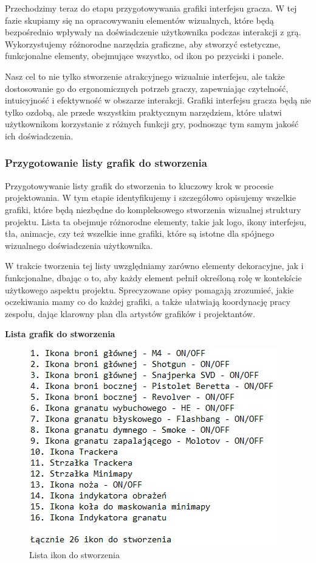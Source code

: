 Przechodzimy teraz do etapu przygotowywania grafiki interfejsu gracza. W tej fazie skupiamy się na opracowywaniu elementów wizualnych, które będą bezpośrednio wpływały na doświadczenie użytkownika podczas interakcji z grą. Wykorzystujemy różnorodne narzędzia graficzne, aby stworzyć estetyczne, funkcjonalne elementy, obejmujące wszystko, od ikon po przyciski i panele.

Nasz cel to nie tylko stworzenie atrakcyjnego wizualnie interfejsu, ale także dostosowanie go do ergonomicznych potrzeb graczy, zapewniając czytelność, intuicyjność i efektywność w obszarze interakcji. Grafiki interfejsu gracza będą nie tylko ozdobą, ale przede wszystkim praktycznym narzędziem, które ułatwi użytkownikom korzystanie z różnych funkcji gry, podnosząc tym samym jakość ich doświadczenia.

\subsubsection{Przygotowanie listy grafik do stworzenia}

Przygotowywanie listy grafik do stworzenia to kluczowy krok w procesie projektowania. W tym etapie identyfikujemy i szczegółowo opisujemy wszelkie grafiki, które będą niezbędne do kompleksowego stworzenia wizualnej struktury projektu. Lista ta obejmuje różnorodne elementy, takie jak logo, ikony interfejsu, tła, animacje, czy też wszelkie inne grafiki, które są istotne dla spójnego wizualnego doświadczenia użytkownika.

W trakcie tworzenia tej listy uwzględniamy zarówno elementy dekoracyjne, jak i funkcjonalne, dbając o to, aby każdy element pełnił określoną rolę w kontekście użytkowego aspektu projektu. Sprecyzowane opisy pomagają zrozumieć, jakie oczekiwania mamy co do każdej grafiki, a także ułatwiają koordynację pracy zespołu, dając klarowny plan dla artystów grafików i projektantów.

\begin{center}
{\bfseries Lista grafik do stworzenia}
\end{center}
\begin{figure}[h]
    \centering
    \includegraphics[scale=0.7]{Images/ListaIkon.jpg}
    \caption{Lista ikon do stworzenia}
    \label{fig:visBuglist}
\end{figure}
\FloatBarrier


